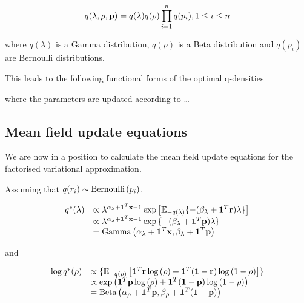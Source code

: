 \documentclass{amsart}
\begin{document}
$$
q(\lambda, \rho, {\bf p}) = q(\lambda) q(\rho) \prod_{i=1}^n q(p_i), 1 \leq i \leq n
$$

\noindent where $q(\lambda)$ is a Gamma distribution, $q(\rho)$ is a Beta distribution and
$q(p_i)$ are Bernoulli distributions.

\noindent This leads to the following functional forms of the optimal q-densities


\noindent where the parameters are updated according to \ldots


\subsection{Mean field update equations}
We are now in a position to calculate the mean field update equations for the factorised
variational approximation.

Assuming that $q(r_i) \sim {\text{Bernoulli} \left( p_i \right)}$,

$$
\begin{array}{ll}
q^*(\lambda) &\propto \lambda^{\alpha_\lambda+{\bf 1}^T{\bf x} - 1} \exp{\left[ {\mathbb E}_{-q(\lambda)} \{-(\beta_\lambda + {\bf1}^T{\bf r}) \lambda \} \right]} \\
&\propto \lambda^{\alpha_\lambda+{\bf 1}^T{\bf x} - 1} \exp{\{-(\beta_\lambda + {\bf1}^T{\bf p})\lambda \} } \\
&= {\text{Gamma} \left( \alpha_\lambda+{\bf 1}^T{\bf x}, \beta_\lambda+{\bf 1}^T{\bf p} \right)}
\end{array}
$$

and

$$
\begin{array}{ll}
\log{q^*(\rho)} &\propto \{ {\mathbb E}_{-q(\rho)} \left[ {\bf 1}^T{\bf r} \log{(\rho)} + {\bf 1}^T({\bf 1} - {\bf r}) \log{(1 - \rho)} \right] \} \\
&\propto \exp{ \left( {\bf1}^T{\bf p}\log{(\rho)} + {\bf1}^T({\bf1}- {\bf p}) \log{(1 - \rho)} \right) } \\
&= {\text{Beta} \left( \alpha_\rho + {\bf 1}^T{\bf p}, \beta_\rho + {\bf 1}^T({\bf 1} - {\bf p}) \right)}
\end{array}
$$
\end{document}
